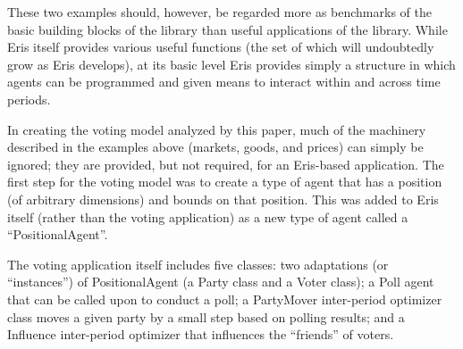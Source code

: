 \documentclass[12pt]{article}
\numberwithin{equation}{subsection}
\begin{document}
These two examples should, however, be regarded more as benchmarks of the basic building blocks of
the library than useful applications of the library.  While Eris itself provides various useful
functions (the set of which will undoubtedly grow as Eris develops), at its basic level Eris
provides simply a structure in which agents can be programmed and given means to interact within and
across time periods.

In creating the voting model analyzed by this paper, much of the machinery described in the examples
above (markets, goods, and prices) can simply be ignored; they are provided, but not required, for
an Eris-based application.  The first step for the voting model was to create a type of agent that
has a position (of arbitrary dimensions) and bounds on that position.  This was added to Eris itself
(rather than the voting application) as a new type of agent called a ``PositionalAgent''.

The voting application itself includes five classes: two adaptations (or ``instances'') of
PositionalAgent (a Party class and a Voter class); a Poll agent that can be called upon to conduct a
poll; a PartyMover inter-period optimizer class moves a given party by a small step based on polling
results; and a Influence inter-period optimizer that influences the ``friends'' of voters.



%
%
%
\end{document}
